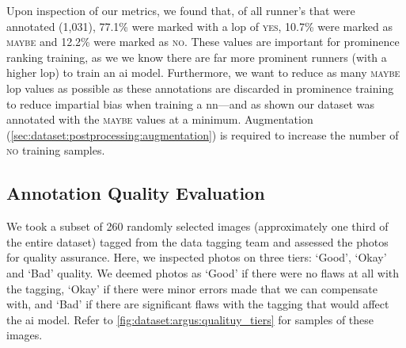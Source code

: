 Upon inspection of our  metrics, we found that, of all runner's that were annotated (1,031), 77.1\% were marked with a \gls{lop} of \textsc{yes}, 10.7\% were marked as \textsc{maybe} and 12.2\% were marked as \textsc{no}. These values are important for prominence ranking training, as we we know there are far more prominent runners (with a higher \gls{lop}) to train an \gls{ai} model. Furthermore, we want to reduce as many \textsc{maybe} \gls{lop} values as possible as these annotations are discarded in prominence training to reduce impartial bias when training a \gls{nn}---and as shown our dataset was annotated with the \textsc{maybe} values at a minimum. Augmentation (\cref{sec:dataset:postprocessing:augmentation}) is required to increase the number of \textsc{no} training samples.

\subsection{Annotation Quality Evaluation}
\label{sec:dataset:argus:quality_eval}

We took a subset of 260 randomly selected images  (approximately one third of the entire dataset) tagged from the data tagging team and assessed the photos for quality assurance. Here, we inspected photos on three tiers: `Good', `Okay' and `Bad' quality. We deemed photos as `Good' if there were no flaws at all with the tagging, `Okay' if there were minor errors made that we can compensate with, and `Bad' if there are significant flaws with the tagging that would affect the \gls{ai} model. Refer to \cref{fig:dataset:argus:qualituy_tiers} for samples of these images.

